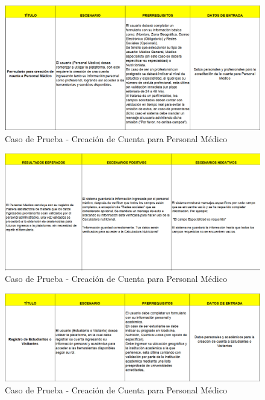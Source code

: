 \documentclass[12pt,letterpaper,spanish, xcolor=table]{report}
\numberwithin{figure}{subsection}
\begin{document}
	\begin{figure}[H]
		\centering
		\includegraphics[width=1.0\textwidth]
		{Imagenes/CalculadoraNutricional/CPCuentaMedico.png}
		\caption{Caso de Prueba - Creación de Cuenta para Personal Médico
		}\label{a2}
	\end{figure}
	
	\begin{figure}[H]
		\centering
		\includegraphics[width=1.0\textwidth]
		{Imagenes/CalculadoraNutricional/CPCuentaMedico2.png}
		\caption{Caso de Prueba - Creación de Cuenta para Personal Médico
		}\label{a2}
	\end{figure}
	
	\begin{figure}[H]
		\centering
		\includegraphics[width=1.0\textwidth]
		{Imagenes/CalculadoraNutricional/CPCuentaEstudiante.png}
		\caption{Caso de Prueba - Creación de Cuenta para Personal Médico
		}\label{a2}
	\end{figure}
	
\end{document}

